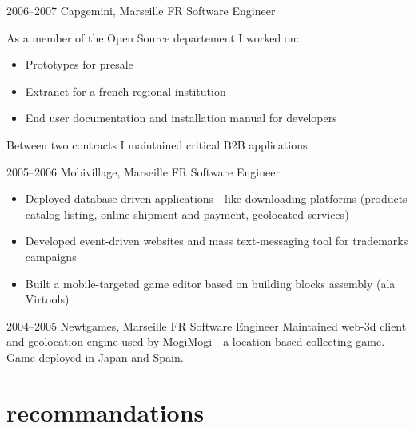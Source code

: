 \documentclass[]{friggeri}
\begin{document}
\begin{entrylist}
  \entry
    {2006–2007}
    {Capgemini, Marseille FR}
    {Software Engineer}
    {As a member of the Open Source departement I worked on:
    \begin{itemize}
    \item Prototypes for presale
    \item Extranet for a french regional institution
    \item End user documentation and installation manual for developers
    \end{itemize}
    Between two contracts I maintained critical B2B applications.}
  \entry
    {2005–2006}
    {Mobivillage, Marseille FR}
    {Software Engineer}
    {\begin{itemize}
    \item Deployed database-driven applications - like downloading platforms (products catalog listing, online shipment and payment, geolocated services)
    \item Developed event-driven websites and mass text-messaging tool for trademarks campaigns
    \item Built a mobile-targeted game editor based on building blocks assembly (ala Virtools)
    \end{itemize}}
  \entry
    {2004–2005}
    {Newtgames, Marseille FR}
    {Software Engineer}
    {Maintained web-3d client and geolocation engine used by \href{http://mogimogi.com}{MogiMogi} - \href{http://thefeaturearchives.com/100501.html}{a location-based collecting game}. Game deployed in Japan and Spain.}
\end{entrylist}

\section{recommandations}
\end{document}
